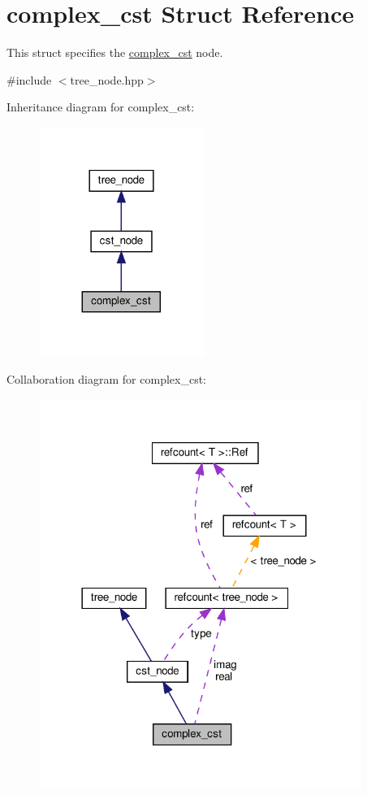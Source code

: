 \hypertarget{structcomplex__cst}{}\section{complex\+\_\+cst Struct Reference}
\label{structcomplex__cst}


This struct specifies the \hyperlink{structcomplex__cst}{complex\+\_\+cst} node.  




{\ttfamily \#include $<$tree\+\_\+node.\+hpp$>$}



Inheritance diagram for complex\+\_\+cst\+:
\nopagebreak
\begin{figure}[H]
\begin{center}
\leavevmode
\includegraphics[width=152pt]{df/d2a/structcomplex__cst__inherit__graph}
\end{center}
\end{figure}


Collaboration diagram for complex\+\_\+cst\+:
\nopagebreak
\begin{figure}[H]
\begin{center}
\leavevmode
\includegraphics[width=297pt]{d5/da4/structcomplex__cst__coll__graph}
\end{center}
\end{figure}
